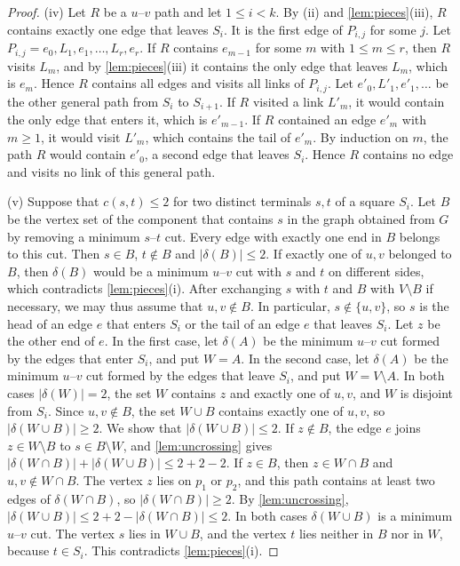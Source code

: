 \documentclass[pdflatex,sn-mathphys-num]{sn-jnl}%
\theoremstyle{thmstyleone}%
\theoremstyle{thmstyletwo}%
\theoremstyle{thmstylethree}%
\begin{document}
\begin{proof}
(iv) Let $R$ be a $u$--$v$ path and let $1 \leq i < k$.
By (ii) and \cref{lem:pieces}(iii), $R$ contains exactly one edge that leaves $S_i$.
It is the first edge of $P_{i,j}$ for some $j$.
Let $P_{i,j} = e_0, L_1, e_1, \dots, L_r, e_r$.
If $R$ contains $e_{m-1}$ for some $m$ with $1 \leq m \leq r$, then $R$ visits $L_m$, and by \cref{lem:pieces}(iii) it contains the only edge that leaves $L_m$, which is $e_m$.
Hence $R$ contains all edges and visits all links of $P_{i,j}$.
Let $e'_0, L'_1, e'_1, \dots$ be the other general path from $S_i$ to $S_{i+1}$.
If $R$ visited a link $L'_m$, it would contain the only edge that enters it, which is $e'_{m-1}$.
If $R$ contained an edge $e'_m$ with $m \geq 1$, it would visit $L'_m$, which contains the tail of $e'_m$.
By induction on $m$, the path $R$ would contain $e'_0$, a second edge that leaves $S_i$.
Hence $R$ contains no edge and visits no link of this general path.

(v) Suppose that $c(s, t) \leq 2$ for two distinct terminals $s, t$ of a square $S_i$.
Let $B$ be the vertex set of the component that contains $s$ in the graph obtained from $G$ by removing a minimum $s$--$t$ cut.
Every edge with exactly one end in $B$ belongs to this cut.
Then $s \in B$, $t \notin B$ and $|\delta(B)| \leq 2$.
If exactly one of $u, v$ belonged to $B$, then $\delta(B)$ would be a minimum $u$--$v$ cut with $s$ and $t$ on different sides, which contradicts \cref{lem:pieces}(i).
After exchanging $s$ with $t$ and $B$ with $V \setminus B$ if necessary, we may thus assume that $u, v \notin B$.
In particular, $s \notin \{u, v\}$, so $s$ is the head of an edge $e$ that enters $S_i$ or the tail of an edge $e$ that leaves $S_i$.
Let $z$ be the other end of $e$.
In the first case, let $\delta(A)$ be the minimum $u$--$v$ cut formed by the edges that enter $S_i$, and put $W = A$.
In the second case, let $\delta(A)$ be the minimum $u$--$v$ cut formed by the edges that leave $S_i$, and put $W = V \setminus A$.
In both cases $|\delta(W)| = 2$, the set $W$ contains $z$ and exactly one of $u, v$, and $W$ is disjoint from $S_i$.
Since $u, v \notin B$, the set $W \cup B$ contains exactly one of $u, v$, so $|\delta(W \cup B)| \geq 2$.
We show that $|\delta(W \cup B)| \leq 2$.
If $z \notin B$, the edge $e$ joins $z \in W \setminus B$ to $s \in B \setminus W$, and \cref{lem:uncrossing} gives $|\delta(W \cap B)| + |\delta(W \cup B)| \leq 2 + 2 - 2$.
If $z \in B$, then $z \in W \cap B$ and $u, v \notin W \cap B$.
The vertex $z$ lies on $p_1$ or $p_2$, and this path contains at least two edges of $\delta(W \cap B)$, so $|\delta(W \cap B)| \geq 2$.
By \cref{lem:uncrossing}, $|\delta(W \cup B)| \leq 2 + 2 - |\delta(W \cap B)| \leq 2$.
In both cases $\delta(W \cup B)$ is a minimum $u$--$v$ cut.
The vertex $s$ lies in $W \cup B$, and the vertex $t$ lies neither in $B$ nor in $W$, because $t \in S_i$.
This contradicts \cref{lem:pieces}(i).
\end{proof}
\end{document}
